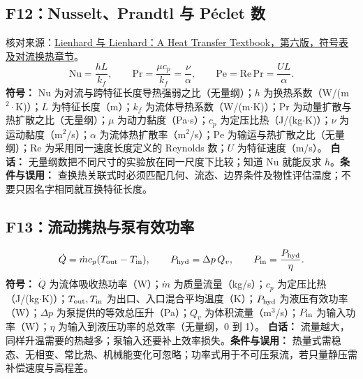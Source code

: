 \documentclass[UTF8,zihao=-4,openany,oneside,fontset=windows]{ctexbook}
\begin{document}
\subsection{F12：Nusselt、Prandtl 与 P\'eclet 数}
核对来源：\href{https://bpb-us-e1.wpmucdn.com/sites.mit.edu/dist/6/1810/files/2024/04/AHTTv600.pdf}{Lienhard 与 Lienhard：A Heat Transfer Textbook，第六版，符号表及对流换热章节}。
\begin{equation}
\mathrm{Nu}=\frac{hL}{k_f},\qquad \mathrm{Pr}=\frac{\mu c_p}{k_f}=\frac\nu\alpha,\qquad \mathrm{Pe}=\mathrm{Re}\,\mathrm{Pr}=\frac{UL}{\alpha}.
\end{equation}
\textbf{符号：} $\mathrm{Nu}$ 为对流与跨特征长度导热强弱之比（无量纲）；$h$ 为换热系数（W/(m$^2\cdot$K)）；$L$ 为特征长度（m）；$k_f$ 为流体导热系数（W/(m$\cdot$K)）；$\mathrm{Pr}$ 为动量扩散与热扩散之比（无量纲）；$\mu$ 为动力黏度（Pa$\cdot$s）；$c_p$ 为定压比热（J/(kg$\cdot$K)）；$\nu$ 为运动黏度（m$^2$/s）；$\alpha$ 为流体热扩散率（m$^2$/s）；$\mathrm{Pe}$ 为输运与热扩散之比（无量纲）；$\mathrm{Re}$ 为采用同一速度长度定义的 Reynolds 数；$U$ 为特征速度（m/s）。
\textbf{白话：} 无量纲数把不同尺寸的实验放在同一尺度下比较；知道 Nu 就能反求 $h$。\textbf{条件与误用：} 查换热关联式时必须匹配几何、流态、边界条件及物性评估温度；不要只因名字相同就互换特征长度。

\subsection{F13：流动携热与泵有效功率}
\begin{equation}
\dot Q=\dot m c_p(T_{\rm out}-T_{\rm in}),\qquad P_{\rm hyd}=\Delta p\,Q_v,\qquad P_{\rm in}=\frac{P_{\rm hyd}}\eta.
\end{equation}
\textbf{符号：} $\dot Q$ 为流体吸收热功率（W）；$\dot m$ 为质量流量（kg/s）；$c_p$ 为定压比热（J/(kg$\cdot$K)）；$T_{\rm out},T_{\rm in}$ 为出口、入口混合平均温度（K）；$P_{\rm hyd}$ 为液压有效功率（W）；$\Delta p$ 为泵提供的等效总压升（Pa）；$Q_v$ 为体积流量（m$^3$/s）；$P_{\rm in}$ 为输入功率（W）；$\eta$ 为输入到液压功率的总效率（无量纲，0 到 1）。
\textbf{白话：} 流量越大，同样升温需要的热越多；泵输入还要补上效率损失。\textbf{条件与误用：} 热量式需稳态、无相变、常比热、机械能变化可忽略；功率式用于不可压泵流，若只量静压需补偿速度与高程差。
\end{document}
